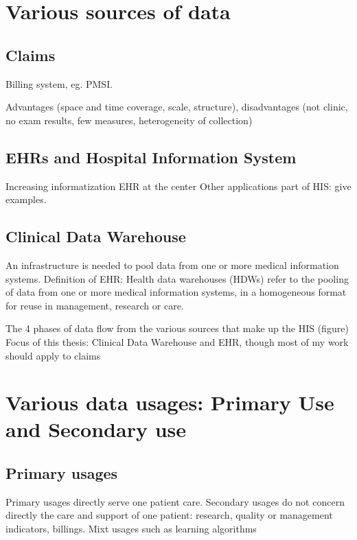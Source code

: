 \documentclass{report}
\begin{document}
\section{Various sources of data}\label{sec:intro:sources}

\subsection{Claims}\label{subsec:intro:claims}

Billing system, eg. PMSI.

Advantages (space and time coverage, scale, structure), disadvantages (not clinic, no exam results, few measures, heterogeneity of collection)

\subsection{EHRs and Hospital Information System}\label{subsec:intro:EHRs}

Increasing informatization
EHR at the center
Other applications part of HIS: give examples.

\subsection{Clinical Data Warehouse}\label{subsec:intro:cdw}
An infrastructure is needed to pool data from one or more medical information systems.
Definition of EHR: Health data warehouses (HDWs) refer to the pooling of data from one or more medical information systems, in a homogeneous format for reuse in management, research or care.


The 4 phases of data flow from the various sources that make up the HIS (figure)
Focus of this thesis: Clinical Data Warehouse and EHR, though most of my work should apply to claims

\section{Various data usages: Primary Use and Secondary use}\label{sec:intro:data_usages}

\subsection{Primary usages}\label{subsec:intro:primary_usages}

Primary usages directly serve one patient care.
Secondary usages do not concern directly the care and support of one patient: research, quality or management indicators, billings.
Mixt usages such as learning algorithms
\end{document}
